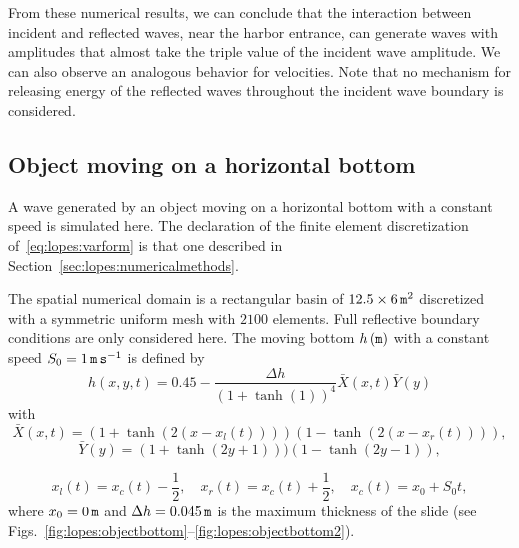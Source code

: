 From these numerical results, we can conclude that the interaction
between incident and reflected waves, near the harbor entrance, can
generate waves with amplitudes that almost take the triple value of
the incident wave amplitude.  We can also observe an analogous
behavior for velocities.  Note that no mechanism for releasing energy
of the reflected waves throughout the incident wave boundary is
considered.

\subsection{Object moving on a horizontal bottom}

A wave generated by an object moving on a horizontal bottom with a
constant speed is simulated here.  The declaration of the finite
element discretization of~\eqref{eq:lopes:varform} is that one
described in Section~\ref{sec:lopes:numericalmethods}.

The spatial numerical domain is a rectangular basin of $12.5\times 6\,
{\tt m}^2$ discretized with a symmetric uniform mesh with $2100$
elements.  Full reflective boundary conditions are only considered
here.  The moving bottom $h\, ({\tt m})$ with a constant speed
$S_0=1\, {\tt m\, s}^{-1}$ is defined by
\begin{equation}
  \label{eq:lopes:bottom1}
  h(x,y,t)=0.45-\frac{\Delta h}{(1+\tanh(1))^4}{\bar
    X}(x,t){\bar Y}(y)
\end{equation}
with
\begin{equation}
  {\bar X}(x,t)=(1+\tanh(2(x-x_l(t))))(1-\tanh(2(x-x_r(t)))),
\end{equation}
\begin{equation}
  {\bar Y}(y)=(1+\tanh(2y+1)))(1-\tanh(2y-1)),
\end{equation}

\begin{equation}
  \label{eq:lopes:bottom4}
  x_l(t)=x_c(t)-\frac{1}{2},\quad
  x_r(t)=x_c(t)+\frac{1}{2},\quad x_c(t)=x_0+S_0t,
\end{equation}
where $x_0=0\, {\tt m}$ and $\Delta h=0.045\, {\tt
m}$ is the maximum thickness of the slide (see
Figs.~\ref{fig:lopes:objectbottom}--\ref{fig:lopes:objectbottom2}).

